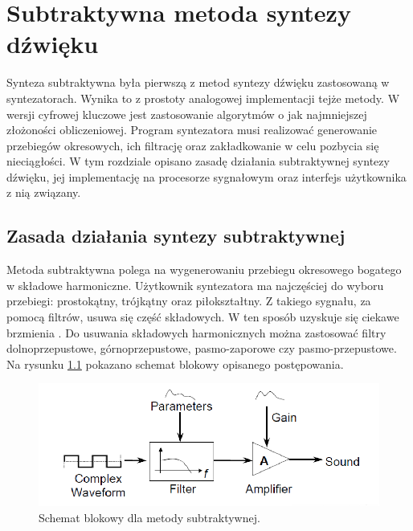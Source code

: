\chapter{Subtraktywna metoda syntezy dźwięku}\label{chapter_subtractive}
Synteza subtraktywna była pierwszą z metod syntezy dźwięku zastosowaną w syntezatorach. Wynika to z prostoty analogowej implementacji tejże metody. W wersji cyfrowej kluczowe jest zastosowanie algorytmów o jak najmniejszej złożoności obliczeniowej. Program syntezatora musi realizować generowanie przebiegów okresowych, ich filtrację oraz zakładkowanie w celu pozbycia się nieciągłości. W tym rozdziale opisano zasadę działania subtraktywnej syntezy dźwięku, jej implementację na procesorze sygnałowym oraz interfejs użytkownika z nią związany.
\section{Zasada działania syntezy subtraktywnej}
Metoda subtraktywna polega na wygenerowaniu przebiegu okresowego bogatego w składowe harmoniczne. Użytkownik syntezatora ma najczęściej do wyboru przebiegi: prostokątny, trójkątny oraz piłokształtny. Z takiego sygnału, za pomocą filtrów, usuwa się część składowych. W ten sposób uzyskuje się ciekawe brzmienia \cite{alles}. Do usuwania składowych harmonicznych można zastosować filtry dolnoprzepustowe, górnoprzepustowe, pasmo-zaporowe czy pasmo-przepustowe. Na rysunku \ref{rys:sub_diagram} pokazano schemat blokowy opisanego postępowania.

\begin{figure}[H]
	\centering
	\includegraphics[width=12cm]{grafiki/sub_diagram}
	\captionsetup{justification=centering}
	\caption{Schemat blokowy dla metody subtraktywnej.}
	\label{rys:sub_diagram}
\end{figure}


